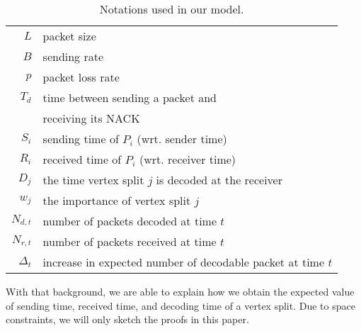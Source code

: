 
    \begin{table}
    \begin{centering}
    \begin{tabular}{|r|l|}
    \hline
    $L$ & packet size \\
    $B$ & sending rate \\
    $p$ & packet loss rate \\
    $T_d$ & time between sending a packet and \\
          & receiving its NACK\\
    $S_i$ & sending time of $P_i$ (wrt. sender time)\\
    $R_i$ & received time of $P_i$ (wrt. receiver time)\\
    $D_j$ & the time vertex split $j$ is decoded at the receiver \\
    $w_j$ & the importance of vertex split $j$ \\
    $N_{d,t}$ & number of packets decoded at time $t$ \\
    $N_{r,t}$ & number of packets received at time $t$ \\
    $\Delta_t$ & increase in expected number of decodable packet at time $t$\\
    \hline
    \end{tabular}
    \caption{Notations used in our model\label{t:model:notation}.}
    \end{centering}
    \end{table}

    With that background, we are able to explain how we obtain the
    expected value of sending time, received time, and decoding time
    of a vertex split.
\if{}
    Due to space constraints, we will only sketch the proofs in this
    paper.
\fi

